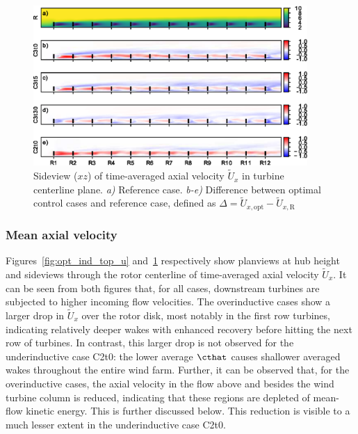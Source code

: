 \begin{figure}[hb!]
	\centering
	\includegraphics[width=0.93\textwidth]{chapters/optimal_induction_control/sideview_u.eps}
	\caption[Sideview ($xz$) of time-averaged axial velocity $\widetilde{U}_x$ in turbine centerline plane.]{Sideview ($xz$) of time-averaged axial velocity $\widetilde{U}_x$ in turbine centerline plane. \emph{a) } Reference case. \emph{b-e)} Difference between optimal control cases and reference case, defined as $\Delta = \widetilde{U}_{x,\text{opt}} - \widetilde{U}_{x,\text{R}}$  \label{fig:opt_ind_side_u}}
\end{figure}	

	\subsubsection{Mean axial velocity}

	Figures~\ref{fig:opt_ind_top_u} and~\ref{fig:opt_ind_side_u} respectively show planviews at hub height and sideviews through the rotor
	centerline of time-averaged axial velocity ${\widetilde{U}}_x$. It can be seen from both figures that, for all cases, downstream
	turbines are subjected to higher incoming flow velocities. The overinductive cases show a larger drop in $\widetilde{U}_x$ over the
	rotor disk, most notably in the first row turbines, indicating relatively deeper wakes with enhanced recovery before hitting the next row of
	turbines. In contrast, this larger drop is not observed for the underinductive case C2t0: the lower average $\cthat$ causes shallower averaged
	wakes throughout the entire wind farm. Further, it can be observed that, for the overinductive cases, the axial velocity in the flow above and
	besides the wind turbine column is reduced, indicating that these regions are depleted of mean-flow kinetic energy. This is further discussed
	below. This reduction is visible to a much lesser extent in the underinductive case C2t0.

